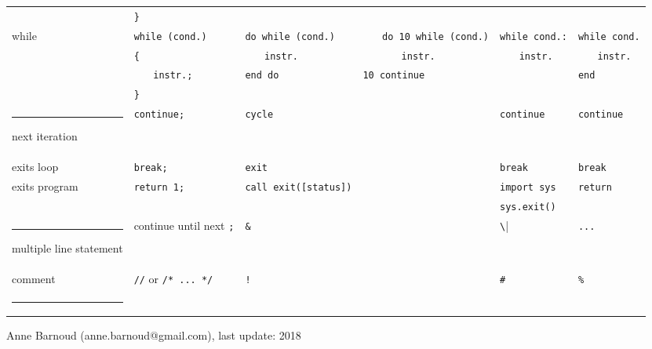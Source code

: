 \documentclass[a3paper,10pt,portrait]{article}
\makeatletter
\def\hlinewd#1{%
\noalign{\ifnum0=`}\fi\hrule \@height #1 %
\futurelet\reserved@a\@xhline}
\newcommand{\hhline}{\hlinewd{1pt}}	%
\renewcommand{\hline}{\hlinewd{0.1pt}}	%
\newcommand{\incr}{$\phantom{mm}$}
\makeatother
\begin{document}
\begin{center}
\begin{tabular}{p{4cm} p{4cm} p{4cm} p{4cm} p{4cm} p{4cm}}
			& \verb|}| 			& \verb|| 		& \verb|| 			& \verb|| 			& \verb||		\\
while & \verb|while (cond.)|	& \verb|do while (cond.)|	& \incr\verb|do 10 while (cond.)| & \verb|while cond.:| & \verb|while cond.| \\
& \verb|{| 			& \incr\verb|instr.| 		& \incr\incr\verb|instr.| & \incr\verb|instr.|& \incr\verb|instr.| \\
& \incr\verb|instr.;| 		& \verb|end do| 		& \verb|10 continue| & & \verb|end| \\
& \verb|}| 			& 				& & & \\
\hline
%
next iteration	& \verb|continue;|	& \verb|cycle| & \verb|| 		& \verb|continue| 	& \verb|continue| 	\\
exits loop		& \verb|break;|		& \verb|exit| & \verb|| 		& \verb|break| 		& \verb|break| 	\\	
exits program	& \verb|return 1;|	& \verb|call exit([status])| & \verb|| 		& \verb|import sys| & \verb|return|	\\
& & & & \verb|sys.exit()| & \\
\hline
%
multiple line statement	& continue until next \verb|;|	& \verb|&| & \verb|| 		& \verb|\| 		& \verb|...| 		\\
comment & \verb|//| or \verb|/* ... */| & \verb|!| & & \verb|#| & \verb|%| \\
\hhline
\end{tabular}
\end{center}

\vfill
Anne Barnoud (anne.barnoud@gmail.com), last update: 2018
\end{document}

